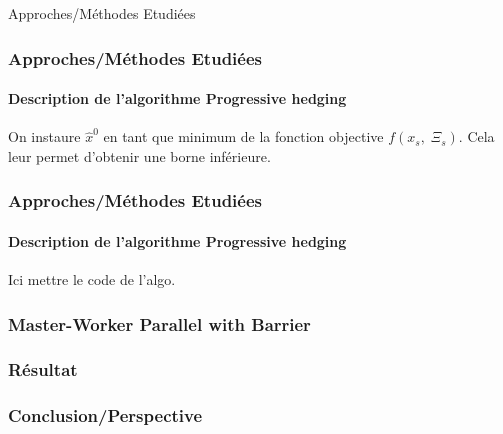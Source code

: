 \documentclass[10pt]{beamer}
\begin{document}
    
    \begin{section}{Approches/Méthodes Etudiées}
    \begin{frame}
        \frametitle{Approches/Méthodes Etudiées}
        \framesubtitle{Description de l'algorithme Progressive hedging}
        On instaure $\hat{x}^0$ en tant que minimum de la fonction objective $f(x_s, \; \Xi_s)$. Cela leur permet d'obtenir une borne inférieure.
        
    \end{frame}
    
    \begin{frame}
        \frametitle{Approches/Méthodes Etudiées}
        \framesubtitle{Description de l'algorithme Progressive hedging}
         Ici mettre le code de l'algo.
        
        
    \end{frame}
    \end{section}
    
    
    \begin{frame}
        \frametitle{Master-Worker Parallel with Barrier}            
    \end{frame}
        
    \begin{frame}
        \frametitle{Résultat}
    \end{frame}
        
    \begin{frame}
        \frametitle{Conclusion/Perspective}
    \end{frame}
    
    \iffalse
    \fi
\end{document}
